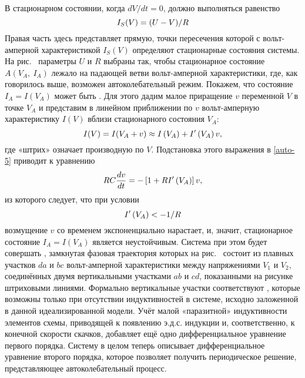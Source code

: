 В стационарном состоянии, когда $dV / dt = 0$, должно выполняться равенство
\begin{equation}
	\eqmark{auto-6}
	I_S(V)=(U-V)/R
\end{equation}
Правая часть здесь представляет  прямую, точки
пересечения которой с вольт-амперной характеристикой ${{I}_{S}}\left( V \right)$
определяют стационарные состояния системы. На рис.~ параметры $U$
и $R$ выбраны так, чтобы стационарное состояние $A(V_A,~I_A)$ лежало на падающей
ветви вольт-амперной характеристики, где, как говорилось выше, возможен
автоколебательный режим. Покажем, что состояние $I_A=I(V_A)$ может быть
. Для этого дадим малое приращение $v$ переменной $V$ в
точке
$V_A$ и представим в линейном приближении по $v$ вольт-амперную характеристику
$I(V)$ вблизи стационарного состояния $V_A$:
\begin{equation}
	\eqmark{auto-7}
	I(V)=I(V_A + v)\approx I\left( V_A \right)+{I}'\left( V_A \right)v,
\end{equation}
где «штрих» означает производную по $V$. Подстановка этого выражения в
\eqref{auto-5} приводит к уравнению
\begin{equation}
	\eqmark{auto-8}
	RC\frac{dv}{dt}=-\left[ 1+R{I}'\left( V_A \right) \right]v,
\end{equation}
из которого следует, что при условии
\begin{equation}
	\eqmark{auto-9}
	I'\left( V_A \right) <- {1}/{R}
\end{equation}
возмущение $v$ со временем экспоненциально нарастает, и, значит, стационарное
состояние $I_A=I(V_A)$ является неустойчивым. Система при этом будет совершать
, замкнутая фазовая траектория которых
на рис.~ состоит из плавных участков $da$ и $bc$ вольт-амперной
характеристики между напряжениями $V_1$ и $V_2$, соединённых двумя вертикальными
участками $ab$ и $cd$, показанными на рисунке штриховыми линиями. Формально
вертикальные участки соответствуют , которые возможны
только при отсутствии индуктивностей в системе, исходно заложенной в данной
идеализированной модели. Учёт малой «паразитной» индуктивности элементов схемы,
приводящей к появлению э.д.с. индукции и, соответственно, к конечной скорости
скачков, добавляет ещё одно дифференциальное уравнение первого порядка. Систему
в целом теперь описывает дифференциальное уравнение второго порядка, которое
позволяет получить периодическое решение, представляющее автоколебательный
процесс.

